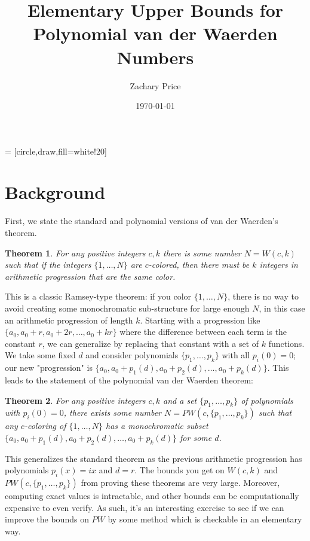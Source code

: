 \documentclass[a4paper]{amsproc}
\title{Elementary Upper Bounds for Polynomial van der Waerden Numbers}
\author[Price]{Zachary Price}
\date{\today}
\theoremstyle{plain}
\newtheorem{thm}{Theorem}[section]
\begin{document}
 = [circle,draw,fill=white!20]

\vspace{18mm} \setcounter{page}{1} \thispagestyle{empty}

\begin{abstract}

\end{abstract}

\maketitle

\section{Background}

First, we state the standard and polynomial versions of van der Waerden's theorem.

\begin{thm}
  For any positive integers $c,k$ there is some number $N=W(c,k)$ such that if the integers $\{1,\ldots,N\}$ are $c$-colored, then there must be $k$ integers in arithmetic progression that are the same color.
\end{thm}

This is a classic Ramsey-type theorem: if you color $\{1,\ldots,N\}$, there is no way to avoid creating some monochromatic sub-structure for large enough $N$, in this case an arithmetic progression of length $k$.
Starting with a progression like $\{a_0, a_0+r, a_0+2r,\ldots, a_0+kr\}$ where the difference between each term is the constant $r$, we can generalize by replacing that constant with a set of $k$ functions.
We take some fixed $d$ and consider polynomials $\{p_1,\ldots,p_k\}$ with all $p_i(0)=0$; our new "progression" is $\{a_0, a_0+p_1(d), a_0+p_2(d),\ldots, a_0+p_k(d)\}$.
This leads to the statement of the polynomial van der Waerden theorem:

\begin{thm}
  For any positive integers $c,k$ and a set $\{p_1,\ldots,p_k\}$ of polynomials with $p_i(0)=0$, there exists some number $N=PW(c,\{p_1,\ldots,p_k\})$ such that any $c$-coloring of $\{1,\ldots,N\}$ has a monochromatic subset \\${\{a_0, a_0+p_1(d), a_0+p_2(d),\ldots, a_0+p_k(d)\}}$ for some $d$.
\end{thm}

This generalizes the standard theorem as the previous arithmetic progression has polynomials $p_i(x) = ix$ and $d=r$.
The bounds you get on $W(c,k)$ and $PW(c,\{p_1,\ldots,p_k\})$ from proving these theorems are very large.
Moreover, computing exact values is intractable, and other bounds can be computationally expensive to even verify.
As such, it's an interesting exercise to see if we can improve the bounds on $PW$ by some method which is checkable in an elementary way.
\end{document}
